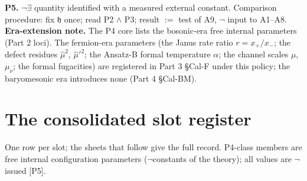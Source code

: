 \documentclass[11pt,openany]{report}
\theoremstyle{canonplain}
\theoremstyle{canondef}
\begin{document}
\label{tag:P5}
\textbf{P5.} $\neg\exists$ quantity identified with a measured external constant. Comparison procedure: fix $\mathfrak h$ once; read P2 $\wedge$ P3; result $:=$ test of A9, $\neg$ input to A1–A8. \textbf{Era-extension note.} The P4 core lists the bosonic-era free internal parameters (Part 2 loci). The fermion-era parameters (the Janus rate ratio $r=x_+/x_-$; the defect residues $\hat\mu^2$, $\hat\mu'^2$; the Ansatz-B formal temperature $\alpha$; the channel scales $\mu$, $\mu_\nu$; the formal fugacities) are registered in Part 3 §Cal-F under this policy; the baryomesonic era introduces none (Part 4 §Cal-BM).

\section*{\texorpdfstring{The consolidated slot register}{The consolidated slot register}}
One row per slot; the sheets that follow give the full record. P4-class members are free internal configuration parameters ($\neg$constants of the theory); all values are $\neg$issued [P5].
\begingroup\small
\end{document}
